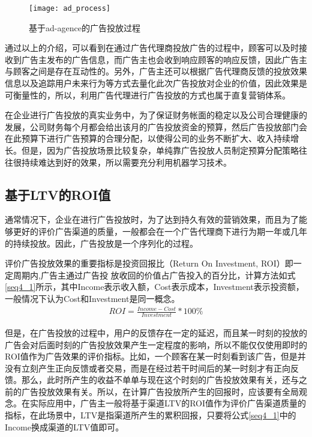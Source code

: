 \begin{figure}[htbp]
\centering
\texttt{[image: ad\_process]}
\caption{基于ad-agence的广告投放过程}
\label{fig:ad_process}
\end{figure}

通过以上的介绍，可以看到在通过广告代理商投放广告的过程中，顾客可以及时接收到广告主发布的广告信息，而广告主也会收到响应顾客的响应反馈，因此广告主与顾客之间是存在互动性的。另外，广告主还可以根据广告代理商反馈的投放效果信息以及追踪用户未来行为等方式去量化此次广告投放对企业的价值，因此效果是可衡量性的，所以，利用广告代理进行广告投放的方式也属于直复营销体系。

在企业进行广告投放的真实业务中，为了保证财务帐面的稳定以及公司合理健康的发展，公司财务每个月都会给出该月的广告投放资金的预算，然后广告投放部门会在此预算下进行广告预算的合理分配，以使得公司的业务不断扩大、收入持续增长。但是，因为广告投放场景比较复杂，单纯靠广告投放人员制定预算分配策略往往很持续难达到好的效果，所以需要充分利用机器学习技术。

\subsection{基于LTV的ROI值}
通常情况下，企业在进行广告投放时，为了达到持久有效的营销效果，而且为了能够更好的评价广告渠道的质量，一般都会在一个广告代理商下进行为期一年或几年的持续投放。因此，广告投放是一个序列化的过程。

评价广告投放效果的重要指标是投资回报比（Return On Investment, ROI）即一定周期内,广告主通过广告投
放收回的价值占广告投入的百分比，计算方法如式\eqref{seq4_1}所示，其中Income表示收入额，Cost表示成本，Investment表示投资额，一般情况下认为Cost和Investment是同一概念。
\begin{equation}
\label{seq4_1}
\begin{aligned}
 ROI=\frac{Income-Cost}{Investment}*100\%
\end{aligned}
\end{equation}

但是，在广告投放的过程中，用户的反馈存在一定的延迟，而且某一时刻的投放的广告会对后面时刻的广告投放效果产生一定程度的影响，所以不能仅仅使用即时的ROI值作为广告效果的评价指标。比如，一个顾客在某一时刻看到该广告，但是并没有立刻产生正向反馈或者交易，而是在经过若干时间后的某一时刻才有正向反馈。那么，此时所产生的收益不单单与现在这个时刻的广告投放效果有关，还与之前的广告投放效果有关。所以，在计算广告投放所产生的回报时，应该要有全局观念。在实际应用中，广告主一般将基于渠道LTV的ROI值作为评价广告渠道质量的指标，在此场景中，LTV是指渠道所产生的累积回报，只要将公式\eqref{seq4_1}中的Income换成渠道的LTV值即可。

